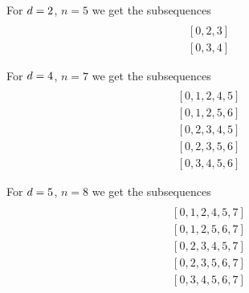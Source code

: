 \begin{example}
  For $d=2$, $n=5$ we get the subsequences
  \begin{align*}
  [0, 1, 2] \\
  [0, 2, 3] \\
  [0, 3, 4]
  \end{align*}

  For $d=4$, $n=7$ we get the subsequences
  \begin{align*}
  [0, 1, 2, 3, 4] \\
  [0, 1, 2, 4, 5] \\
  [0, 1, 2, 5, 6] \\
  [0, 2, 3, 4, 5] \\
  [0, 2, 3, 5, 6] \\
  [0, 3, 4, 5, 6]
  \end{align*}


  For $d=5$, $n=8$ we get the subsequences
  \begin{align*}
  [0, 1, 2, 3, 4, 7] \\
  [0, 1, 2, 4, 5, 7] \\
  [0, 1, 2, 5, 6, 7] \\
  [0, 2, 3, 4, 5, 7] \\
  [0, 2, 3, 5, 6, 7] \\
  [0, 3, 4, 5, 6, 7]
  \end{align*}
\end{example}
